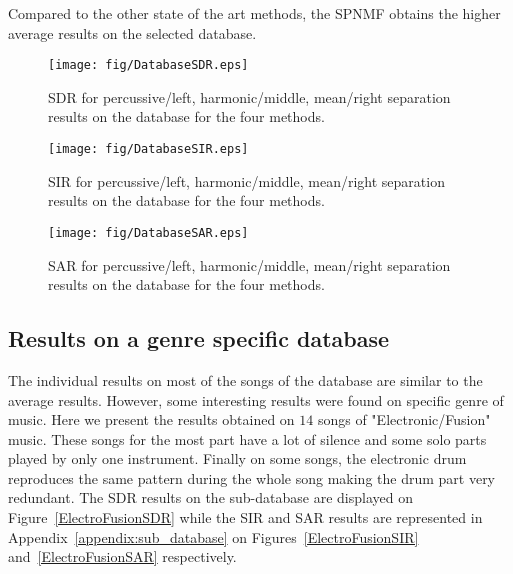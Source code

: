 Compared to the other state of the art methods, the SPNMF obtains the higher average results on the selected database. 


\begin{figure}[h]

  \centering 
  \texttt{[image: fig/DatabaseSDR.eps]}
  \caption{\label{DatabaseSDR} SDR for percussive/left, harmonic/middle, mean/right separation results on the database for the four methods.}
  
\end{figure}

\begin{figure}[h]

  \centering 
  \texttt{[image: fig/DatabaseSIR.eps]}
  \caption{\label{DatabaseSIR} SIR for percussive/left, harmonic/middle, mean/right separation results on the database for the four methods.}
  
\end{figure}

\begin{figure}[h]

  \centering 
  \texttt{[image: fig/DatabaseSAR.eps]}
  \caption{\label{DatabaseSAR} SAR for percussive/left, harmonic/middle, mean/right separation results on the database for the four methods.}
  
\end{figure}




\subsection{Results on a genre specific database}
\label{sec:subdata}

The individual results on most of the songs of the database are similar to the average results. However, some interesting results were found on specific genre of music. Here we present the results obtained on $14$ songs of "Electronic/Fusion" music. These songs for the most part have a lot of silence and some solo parts played by only one instrument. Finally on some songs, the electronic drum reproduces the same pattern during the whole song making the drum part very redundant. The SDR results on the sub-database are displayed on Figure~\ref{ElectroFusionSDR} while the SIR and SAR results are represented in Appendix~\ref{appendix:sub_database} on Figures~\ref{ElectroFusionSIR} and~\ref{ElectroFusionSAR} respectively. 


